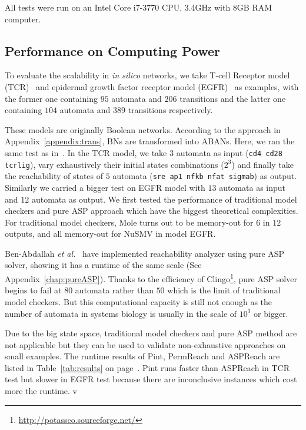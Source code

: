 All tests were run on an Intel Core i7-3770 CPU, \@3.4GHz with 8GB RAM computer.

\subsection{Performance on Computing Power}
To evaluate the scalability in \textit{in silico} networks, we take T-cell Receptor model (TCR)~\cite{saez2007logical} and epidermal growth factor receptor model (EGFR)~\cite{samaga2009logic} as examples, with the former one containing $95$ automata and $206$ transitions and the latter one containing $104$ automata and $389$ transitions respectively. 

These models are originally Boolean networks.
According to the approach in Appendix~\ref{appendix:trans}, BNs are transformed into ABANs. 
Here, we ran the same test as in~\cite{folschette2015}. In the TCR model, we take $3$ automata as input (\texttt{cd4 cd28 tcrlig}), vary exhaustively their initial states combinations ($2^3$) and finally take the reachability of states of $5$ automata (\texttt{sre ap1 nfkb nfat sigmab}) as output. 
Similarly we carried a bigger test on EGFR model with $13$ automata %
as input and $12$ automata %
as output.
We first tested the performance of traditional model checkers and pure ASP approach which have the biggest theoretical complexities. 
For traditional model checkers, Mole turns out to be memory-out for $6$ in $12$ outputs, and all memory-out for NuSMV in model EGFR. 

Ben-Abdallah \textit{et al.}~\cite{abdallah2015exhaustive} have implemented reachability analyzer using pure ASP solver, showing it has a runtime of the same scale (See Appendix~\ref{chap:pureASP}).
Thanks to the efficiency of Clingo\footnote{\url{http://potassco.sourceforge.net/}}, pure ASP solver begins to fail at $80$ automata rather than $50$ which is the limit of traditional model checkers. 
But this computational capacity is still not enough as the number of automata in systems biology is usually in the scale of $10^3$ or bigger.

Due to the big state space, traditional model checkers and pure ASP method are not applicable but they can be used to validate non-exhaustive approaches on small examples.
The runtime results of Pint, PermReach and ASPReach are listed in Table~\ref{tab:results} on page~\pageref{tab:results}.
Pint runs faster than ASPReach in TCR test but slower in EGFR test because there are inconclusive instances which cost more the runtime.
v
